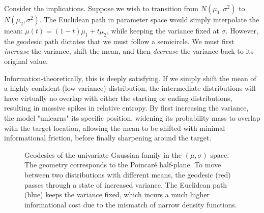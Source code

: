 Consider the implications. Suppose we wish to transition from $N(\mu_1, \sigma^2)$ to $N(\mu_2, \sigma^2)$. The Euclidean path in parameter space would simply interpolate the mean: $\mu(t) = (1-t)\mu_1 + t\mu_2$, while keeping the variance fixed at $\sigma$. However, the geodesic path dictates that we must follow a semicircle. We must first \textit{increase} the variance, shift the mean, and then \textit{decrease} the variance back to its original value. 

Information-theoretically, this is deeply satisfying. If we simply shift the mean of a highly confident (low variance) distribution, the intermediate distributions will have virtually no overlap with either the starting or ending distributions, resulting in massive spikes in relative entropy. By first increasing the variance, the model "unlearns" its specific position, widening its probability mass to overlap with the target location, allowing the mean to be shifted with minimal informational friction, before finally sharpening around the target.

\begin{figure}[htbp]
\centering
{}
\caption{Geodesics of the univariate Gaussian family in the $(\mu, \sigma)$ space. The geometry corresponds to the Poincaré half-plane. To move between two distributions with different means, the geodesic (red) passes through a state of increased variance. The Euclidean path (blue) keeps the variance fixed, which incurs a much higher informational cost due to the mismatch of narrow density functions.}
\label{fig:poincare_gaussian}
\end{figure}

